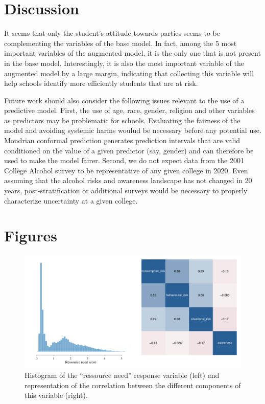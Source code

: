 \documentclass[10pt]{amsart}%
\begin{document}
\section{Discussion}
\label{sec:disc}

It seems that only the student's attitude towards parties seems to be complementing the variables of the base model. In fact, among the $5$ most important variables of the augmented model, it is the only one that is not present in the base model. Interestingly, it is also the most important variable of the augmented model by a large margin, indicating that collecting this variable will help schools identify more efficiently students that are at risk.

Future work should also consider the following issues relevant to the use of a predictive model. First, the use of age, race, gender, religion and other variables as predictors may be  problematic for schools. Evaluating the fairness of the model and avoiding systemic harms woulud be necessary before any potential use. Mondrian conformal prediction \cite{Vovk.2005} generates prediction intervals that are valid conditioned on the value of a given predictor (say, gender) and can therefore be used to make the model fairer. Second, we do not expect data from the 2001 College Alcohol survey to be representative of any given college in 2020. Even assuming that the alcohol risks and awareness landscape has not changed in 20 years, post-stratification or additional surveys would be necessary to properly characterize uncertainty at a given college.






\newpage
\appendix

\section{Figures}

\begin{center}
\begin{figure}[h]
  \includegraphics[width=\linewidth]{Figures/response.pdf}
  \caption{Histogram of the ``ressource need'' response variable (left) and representation of the correlation between the different components of this variable (right).}
  \label{fig:resp}
\end{figure}
\end{center}
\end{document}
